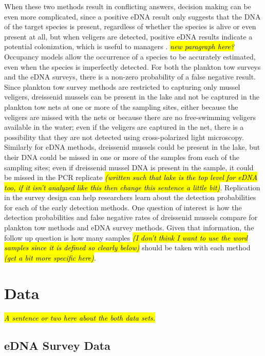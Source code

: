 \documentclass[12pt]{article}\usepackage[]{graphicx}\usepackage[]{color}
\begin{document}
When these two methods result in conflicting answers, decision making can be even more complicated, since a positive eDNA result only suggests that the DNA of the target species is present, regardless of whether the species is alive or even present at all, but when veligers are detected, positive eDNA results indicate a potential colonization, which is useful to managers \cite{Holser:body}. \textit{\hl{new paragraph here?}} Occupancy models allow the occurrence of a species to be accurately estimated, even when the species is imperfectly detected. For both the plankton tow surveys and the eDNA surveys, there is a non-zero probability of a false negative result. Since plankton tow survey methods are restricted to capturing only mussel veligers, dreissenid mussels can be present in the lake and not be captured in the plankton tow nets at one or more of the sampling sites, either because the veligers are missed with the nets or because there are no free-swimming veligers available in the water; even if the veligers are captured in the net, there is a possibility that they are not detected using cross-polarized light microscopy. Similarly for eDNA methods, dreissenid mussels could be present in the lake, but their DNA could be missed in one or more of the samples from each of the sampling sites; even if dreissenid mussel DNA is present in the sample, it could be missed in the PCR replicate \textit{\hl{(written such that lake is the top level for eDNA too, if it isn't analyzed like this  then change this sentence a little bit)}}. Replication in the survey design can help researchers learn about the detection probabilities for each of the early detection methods. One question of interest is how the detection probabilities and false negative rates of dreissenid mussels compare for plankton tow methods and eDNA survey methods. Given that information, the follow up question is how many samples \textit{\hl{(I don't think I want to use the word samples since it is defined so clearly below)}} should be taken with each method \textit{\hl{(get a bit more specific here)}}. 

\section{Data}

\textit{\hl{A sentence or two here about the both data sets.}}

\subsection{eDNA Survey Data}
\end{document}
